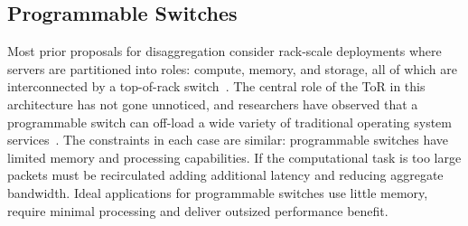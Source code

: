 







\subsection{Programmable Switches}



Most prior proposals for
disaggregation consider rack-scale deployments where
servers are partitioned into roles: compute, memory, and storage, all
of which are interconnected by a top-of-rack
switch~\cite{disandapp,the-machine,intel-rack,firebox,legoos}.  The central
role of the ToR in this architecture has not gone unnoticed, and
researchers have observed that a programmable switch can off-load a
wide variety of traditional operating system
services~\cite{disandapp,mind,netlock,netkv,netchain,netcache}. The
constraints in each case are similar: programmable switches have
limited memory and processing capabilities.  If the computational task
is too large packets must be recirculated adding
additional latency and reducing aggregate bandwidth.  Ideal
applications for programmable switches use little memory, require
minimal processing and deliver outsized performance benefit.

